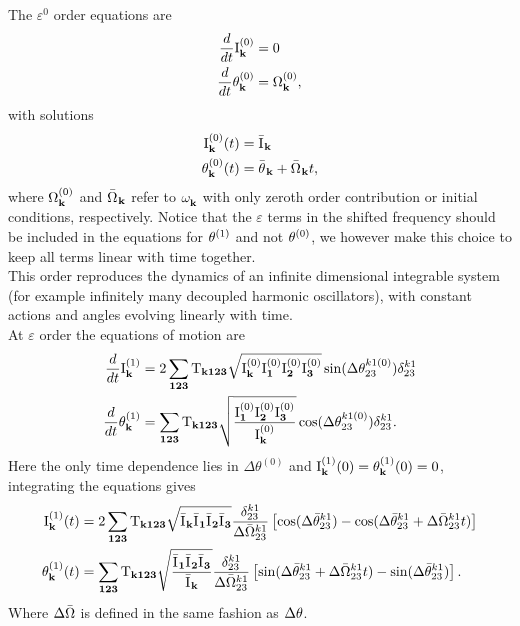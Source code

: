 The $\varepsilon^0$ order equations are
\begin{align}
    \frac{d}{dt}\mathrm{I}^{(0)}_\mathbf{k} &= 0   \\
    \frac{d}{dt}\theta^{(0)}_\mathbf{k} &= \Omega^{(0)}_\mathbf{k}, 
\end{align}
with solutions 
\begin{align}
    \mathrm{I}^{(0)}_\mathbf{k}(t) &= \bar{\mathrm{I}^{}}_\mathbf{k} \label{solzero1}\\
    \theta^{(0)}_\mathbf{k}(t) &= \bar{\theta^{}}_\mathbf{k} + \bar{\Omega^{}}_\mathbf{k}t, \label{solzero2}
\end{align}
where $\Omega^{(0)}_\mathbf{k}$ and $\bar{\Omega^{}}_\mathbf{k}$ refer to $\omega^{}_{\mathbf{k}}$ with only zeroth order contribution or initial conditions, respectively.
Notice that the $\varepsilon$ terms in 
the shifted frequency should be included in the equations for $\theta^{(1)}$ and not $\theta^{(0)}$, we however make this choice to keep 
all terms linear with time together.\\
This order reproduces the dynamics of an infinite dimensional integrable system (for example infinitely many decoupled harmonic oscillators), with constant actions and angles evolving linearly with time. \\

At $\varepsilon$ order the equations of motion are 
\begin{align}
    \frac{d}{dt}\mathrm{I}^{(1)}_\mathbf{k} &= 2\sum_{\mathbf{123}} \mathrm{T}_{\mathbf{k123}} \sqrt{\mathrm{I}^{(0)}_\mathbf{k}\mathrm{I}^{(0)}_\mathbf{1}\mathrm{I}^{(0)}_\mathbf{2}\mathrm{I}^{(0)}_\mathbf{3}} \sin(\Delta\theta^{k1(0)}_{23})\delta^{k1}_{23} \label{hameqone}\\
    \frac{d}{dt}\theta^{(1)}_\mathbf{k} &= \sum_{\mathbf{123}} \mathrm{T}_{\mathbf{k123}} \sqrt{\frac{\mathrm{I}^{(0)}_\mathbf{1}\mathrm{I}^{(0)}_\mathbf{2}\mathrm{I}^{(0)}_\mathbf{3}}{\mathrm{I}^{(0)}_\mathbf{k}}}\cos(\Delta\theta^{k1(0)}_{23})\delta^{k1}_{23}.
\end{align}
Here the only time dependence lies in $\Delta\theta^{(0)}$ and $\mathrm{I}^{(1)}_\mathbf{k}(0) = \theta^{(1)}_\mathbf{k}(0) = 0$, integrating the equations gives
\begin{align}
    \mathrm{I}^{(1)}_\mathbf{k}(t) &= 2\sum_{\mathbf{123}} \mathrm{T}_{\mathbf{k123}} \sqrt{\bar{\mathrm{I}^{}}_\mathbf{k}\bar{\mathrm{I}^{}}_\mathbf{1}\bar{\mathrm{I}^{}}_\mathbf{2}\bar{\mathrm{I}^{}}_\mathbf{3}} \frac{\delta^{k1}_{23}}{\Delta\bar{\Omega}^{k1}_{23}}
    \left[ \cos(\Delta\bar{\theta}^{k1}_{23}) - \cos(\Delta\bar{\theta}^{k1}_{23} + \Delta\bar{\Omega}^{k1}_{23}t) \right] \label{solone1}\\
    \theta^{(1)}_\mathbf{k}(t) &= \sum_{\mathbf{123}} \mathrm{T}_{\mathbf{k123}} \sqrt{\frac{\bar{\mathrm{I}^{}}_\mathbf{1}\bar{\mathrm{I}^{}}_\mathbf{2}\bar{\mathrm{I}^{}}_\mathbf{3}}{\bar{\mathrm{I}^{}}_\mathbf{k}}} \frac{\delta^{k1}_{23}}{\Delta\bar{\Omega}^{k1}_{23}}
    \left[ \sin(\Delta\bar{\theta}^{k1}_{23} + \Delta\bar{\Omega}^{k1}_{23}t) -\sin(\Delta\bar{\theta}^{k1}_{23}) \right]. \label{solone2}
\end{align}
Where $\Delta\bar{\Omega}$ is defined in the same fashion as $\Delta\theta$. \\


